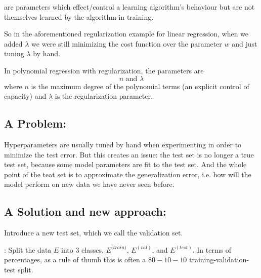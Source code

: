\begin{definition}
     are parameters which effect/control a learning algorithm's behaviour but are not themselves learned by the algorithm  in training.
\end{definition}

So in the aforementioned regularization example for linear regression, when we added $\lambda$ we were still minimizing the cost function over the parameter $w$ and just tuning $\lambda$ by hand.

\begin{example}
    
    In polynomial regression with regularization, the parameters are
    \[n \text{ and } \lambda \]
    where $n$ is the maximum degree of the polynomial terms (an explicit control of capacity) and $\lambda$ is the regularization parameter.
\end{example}

\subsection{A Problem:}
Hyperparameters are usually tuned by hand when experimenting in order to minimize the test error. But this creates an issue: the test set is no longer a true test set, because some model parameters are fit to the test set. And the whole point of the teat set is to approximate the generalization error, i.e. how will the model perform on new data we have never seen before. 
\subsection{A Solution and new approach:}
Introduce a new test set, which we call the validation set.
\begin{definition}
    : Split the data $E$ into 3 classes, $E^{({train)}}$, $E^{{(val)}}$, and $E^{{(test)}}$. In terms of percentages, as a rule of thumb this is often a $80-10-10$ training-validation-test split.
\end{definition}

